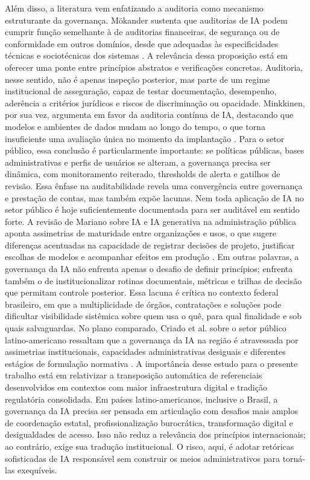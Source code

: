 \documentclass[12pt,a4paper]{article}
\begin{document}
Além disso, a literatura vem enfatizando a auditoria como mecanismo estruturante da governança. Mökander sustenta que auditorias de IA podem cumprir função semelhante à de auditorias financeiras, de segurança ou de conformidade em outros domínios, desde que adequadas às especificidades técnicas e sociotécnicas dos sistemas \autocite{mkander2023auditing}. A relevância dessa proposição está em oferecer uma ponte entre princípios abstratos e verificações concretas. Auditoria, nesse sentido, não é apenas inspeção posterior, mas parte de um regime institucional de asseguração, capaz de testar documentação, desempenho, aderência a critérios jurídicos e riscos de discriminação ou opacidade. Minkkinen, por sua vez, argumenta em favor da auditoria contínua de IA, destacando que modelos e ambientes de dados mudam ao longo do tempo, o que torna insuficiente uma avaliação única no momento da implantação \autocite{minkkinen2022continuous}. Para o setor público, essa conclusão é particularmente importante: se políticas públicas, bases administrativas e perfis de usuários se alteram, a governança precisa ser dinâmica, com monitoramento reiterado, thresholds de alerta e gatilhos de revisão.
Essa ênfase na auditabilidade revela uma convergência entre governança e prestação de contas, mas também expõe lacunas. Nem toda aplicação de IA no setor público é hoje suficientemente documentada para ser auditável em sentido forte. A revisão de Mariano sobre IA e IA generativa na administração pública aponta assimetrias de maturidade entre organizações e usos, o que sugere diferenças acentuadas na capacidade de registrar decisões de projeto, justificar escolhas de modelos e acompanhar efeitos em produção \autocite{mariano2026inteligencia}. Em outras palavras, a governança da IA não enfrenta apenas o desafio de definir princípios; enfrenta também o de institucionalizar rotinas documentais, métricas e trilhas de decisão que permitam controle posterior. Essa lacuna é crítica no contexto federal brasileiro, em que a multiplicidade de órgãos, contratações e soluções pode dificultar visibilidade sistêmica sobre quem usa o quê, para qual finalidade e sob quais salvaguardas.
No plano comparado, Criado et al. sobre o setor público latino-americano ressaltam que a governança da IA na região é atravessada por assimetrias institucionais, capacidades administrativas desiguais e diferentes estágios de formulação normativa \autocite{criado2024inteligencia}. A importância desse estudo para o presente trabalho está em relativizar a transposição automática de referenciais desenvolvidos em contextos com maior infraestrutura digital e tradição regulatória consolidada. Em países latino-americanos, inclusive o Brasil, a governança da IA precisa ser pensada em articulação com desafios mais amplos de coordenação estatal, profissionalização burocrática, transformação digital e desigualdades de acesso. Isso não reduz a relevância dos princípios internacionais; ao contrário, exige sua tradução institucional. O risco, aqui, é adotar retóricas sofisticadas de IA responsável sem construir os meios administrativos para torná-las exequíveis.
\end{document}
